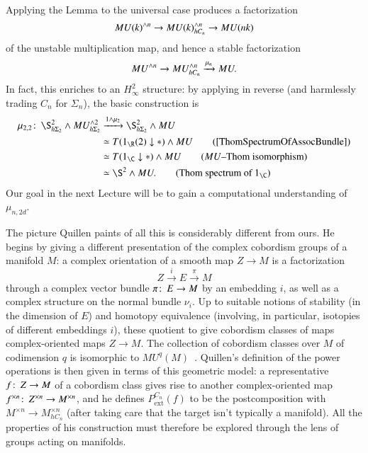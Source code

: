 Applying the Lemma to the universal case produces a factorization \[MU(k)^{\wedge n} \to MU(k)^{\wedge n}_{hC_n} \to MU(nk)\] of the unstable multiplication map, and hence a stable factorization \[MU^{\wedge n} \to MU^{\wedge n}_{hC_n} \xrightarrow{\mu_n} MU.\]  In fact, this enriches to an $H_\infty^2$ structure: by applying  in reverse (and harmlessly trading $C_n$ for $\Sigma_n$), the basic construction is
\begin{align*}
\mu_{2,2}\co \S^2_{h\Sigma_2} \sm MU^{\sm 2}_{h\Sigma_2} & \xrightarrow{1 \sm \mu_2} \S^2_{h\Sigma_2} \sm MU \\
& \simeq T(1_{\R}(2) \downarrow *) \sm MU \tag{\Cref{ThomSpectrumOfAssocBundle}} \\
& \simeq T(1_{\C} \downarrow *) \sm MU \tag{$MU$--Thom isomorphism} \\
& \simeq \S^2 \sm MU. \tag{Thom spectrum of $1_{\C}$}
\end{align*}
Our goal in the next Lecture will be to gain a computational understanding of $\mu_{n,2d}$.

\begin{remark}
The picture Quillen paints of all this is considerably different from ours.  He begins by giving a different presentation of the complex cobordism groups of a manifold $M$: a complex orientation of a smooth map $Z \to M$ is a factorization \[Z \xrightarrow{i} E \xrightarrow{\pi} M\] through a complex vector bundle $\pi\colon\thinspace E \to M$ by an embedding $i$, as well as a complex structure on the normal bundle $\nu_i$.  Up to suitable notions of stability (in the dimension of $E$) and homotopy equivalence (involving, in particular, isotopies of different embeddings $i$), these quotient to give cobordism classes of maps complex-oriented maps $Z \to M$.  The collection of cobordism classes over $M$ of codimension $q$ is isomorphic to $MU^q(M)$~\cite[Proposition 1.2]{Quillen}.  Quillen's definition of the power operations is then given in terms of this geometric model: a representative $f\colon\thinspace Z \to M$ of a cobordism class gives rise to another complex-oriented map $f^{\times n}\colon\thinspace Z^{\times n} \to M^{\times n}$, and he defines $P^{C_n}_{\mathrm{ext}}(f)$ to be the postcomposition with $M^{\times n} \to M^{\times n}_{hC_n}$ (after taking care that the target isn't typically a manifold).  All the properties of his construction must therefore be explored through the lens of groups acting on manifolds.
\end{remark}

